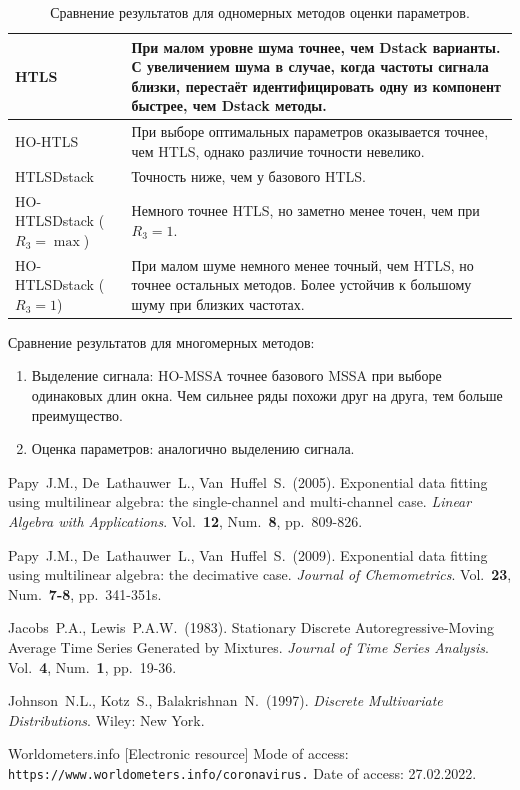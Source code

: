 \documentclass[12pt]{article}
\theoremstyle{definition}
\theoremstyle{remark}
\begin{document}
\begin{table}[!ht]
  \caption{Сравнение результатов для одномерных методов оценки параметров.}
  \label{tab:1d-est}
  \begin{tabularx}{\textwidth}{|p{32mm}|X|} \hline
    HTLS & При малом уровне шума точнее, чем Dstack варианты.
    С увеличением шума в случае, когда частоты сигнала близки, перестаёт
    идентифицировать одну из компонент быстрее, чем Dstack методы. \\ \hline
    HO-HTLS & При выборе оптимальных параметров оказывается точнее, чем
    HTLS, однако различие точности невелико.\\ \hline
    HTLSDstack & Точность ниже, чем у базового HTLS.\\ \hline
    HO-HTLSDstack ($R_3 = \max$) & Немного точнее HTLS, но заметно менее точен,
    чем при $R_3=1$.\\ \hline
    HO-HTLSDstack ($R_3 = 1$) & При малом шуме немного менее точный, чем
    HTLS, но точнее остальных методов.
    Более устойчив к большому шуму при близких частотах. \\ \hline
  \end{tabularx}
\end{table}

Сравнение результатов для многомерных методов:
\begin{enumerate}
  \item Выделение сигнала: HO-MSSA точнее базового MSSA при выборе
    одинаковых длин окна. Чем сильнее ряды похожи друг на друга, тем
    больше преимущество.
  \item Оценка параметров: аналогично выделению сигнала.
\end{enumerate}


\begin{thebibliography}{10}

  Papy~J.M., De~Lathauwer~L., Van~Huffel~S.~(2005).
  Exponential data fitting using multilinear algebra: the
  single-channel and multi-channel case.
  {\sl Linear Algebra with Applications}. Vol.~{\bf 12}, Num.~{\bf 8},
  pp.~809-826.

  Papy~J.M., De~Lathauwer~L., Van~Huffel~S.~(2009).
  Exponential data fitting using multilinear algebra: the decimative case.
  {\sl Journal of Chemometrics}. Vol.~{\bf 23}, Num.~{\bf 7-8},
  pp.~341-351s.

  Jacobs~P.A., Lewis~P.A.W.~(1983). Stationary Discrete
  Autoregressive-Moving Average
  Time Series Generated by Mixtures. {\sl Journal of Time Series
  Analysis}. Vol.~{\bf 4}, Num.~{\bf 1},
  pp.~19-36.

  Johnson~N.L., Kotz~S., Balakrishnan~N.~(1997). {\sl Discrete
  Multivariate Distributions}. Wiley: New York.

  Worldometers.info [Electronic resource] Mode of access:
  \texttt{https://www.worldometers.info/coronavirus.} Date of access:
  27.02.2022.

\end{thebibliography}
\end{document}
